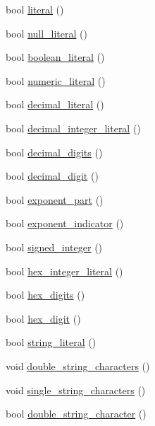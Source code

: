 \begin{DoxyCompactItemize}
bool \hyperlink{class_lexical_grammar_aae192a9c337028f4edbfe210e587d2dc}{literal} ()
\item 
bool \hyperlink{class_lexical_grammar_a2bd963802a60b5d0e1476bdf3019494b}{null\+\_\+literal} ()
\item 
bool \hyperlink{class_lexical_grammar_a80b7dcb7b99bbd553581cd162cd80cb1}{boolean\+\_\+literal} ()
\item 
bool \hyperlink{class_lexical_grammar_a6dd9a9a8baf50e9a99e0df2cbaa8d795}{numeric\+\_\+literal} ()
\item 
bool \hyperlink{class_lexical_grammar_aa4b1f1f944befbe96ee450a0399e85df}{decimal\+\_\+literal} ()
\item 
bool \hyperlink{class_lexical_grammar_afb8b57c8a9457981b9d99704ee78c066}{decimal\+\_\+integer\+\_\+literal} ()
\item 
bool \hyperlink{class_lexical_grammar_a434f04e5a69d078a98dcf9163835dad0}{decimal\+\_\+digits} ()
\item 
bool \hyperlink{class_lexical_grammar_a013dbcda735a0c6c61970de8bd65c0fe}{decimal\+\_\+digit} ()
\item 
bool \hyperlink{class_lexical_grammar_a295f7a8841c4b098113e0a43401488fc}{exponent\+\_\+part} ()
\item 
bool \hyperlink{class_lexical_grammar_a45135be3081ddcdbb776555a6819d45f}{exponent\+\_\+indicator} ()
\item 
bool \hyperlink{class_lexical_grammar_a97e84269213615dc97e8622fc96d0f4c}{signed\+\_\+integer} ()
\item 
bool \hyperlink{class_lexical_grammar_aca046d0a2eacbece1c05fb59548efdbd}{hex\+\_\+integer\+\_\+literal} ()
\item 
bool \hyperlink{class_lexical_grammar_aeace42ff820851c2d59b3d0582cb2e5d}{hex\+\_\+digits} ()
\item 
bool \hyperlink{class_lexical_grammar_afa260bdb5dc9224215a68ba07cce3a4a}{hex\+\_\+digit} ()
\item 
bool \hyperlink{class_lexical_grammar_a11294149e962d00a92cacc8c6567cdc5}{string\+\_\+literal} ()
\item 
void \hyperlink{class_lexical_grammar_a390981ebfe1b2819225b04e65ac1aae0}{double\+\_\+string\+\_\+characters} ()
\item 
void \hyperlink{class_lexical_grammar_aa7f181acaa775e99a212d2e357cae599}{single\+\_\+string\+\_\+characters} ()
\item 
bool \hyperlink{class_lexical_grammar_a473842f8e78b003d65e4459eec57bf8d}{double\+\_\+string\+\_\+character} ()
\item 

\end{DoxyCompactItemize}
